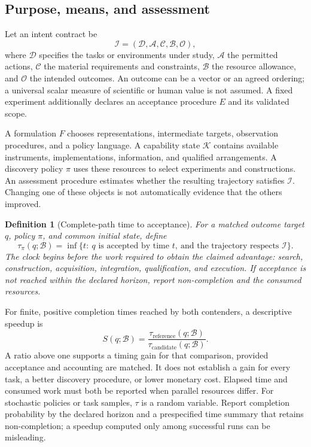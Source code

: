 \documentclass[11pt,letterpaper]{article}
\newtheorem{definition}{Definition}[section]
\theoremstyle{remark}\newtheorem{remark}{Remark}[section]
\newcommand{\I}{\mathcal I}
\newcommand{\K}{\mathcal K}
\newcommand{\D}{\mathcal D}
\newcommand{\A}{\mathcal A}
\begin{document}
\subsection{Purpose, means, and assessment}
Let an intent contract be
\begin{equation}
 \I=(\D,\A,\mathcal C,\mathcal B,\mathcal O),
\end{equation}
where $\D$ specifies the tasks or environments under study, $\A$ the permitted actions,
$\mathcal C$ the material requirements and constraints, $\mathcal B$ the resource allowance,
and $\mathcal O$ the intended outcomes.
An outcome can be a vector or an agreed ordering; a universal scalar measure of scientific or human value is not assumed.
A fixed experiment additionally declares an acceptance procedure $E$ and its validated scope.

A formulation $F$ chooses representations, intermediate targets, observation procedures, and a policy language.
A capability state $\K$ contains available instruments, implementations, information, and qualified arrangements.
A discovery policy $\pi$ uses these resources to select experiments and constructions.
An assessment procedure estimates whether the resulting trajectory satisfies $\I$.
Changing one of these objects is not automatically evidence that the others improved.

\begin{definition}[Complete-path time to acceptance]
For a matched outcome target $q$, policy $\pi$, and common initial state, define
\begin{equation}\label{eq:arrival}
 \tau_\pi(q;\mathcal B)=
 \inf\{t:\ q\text{ is accepted by time }t,\ \text{and the trajectory respects }\I\}.
\end{equation}
The clock begins before the work required to obtain the claimed advantage:
search, construction, acquisition, integration, qualification, and execution.
If acceptance is not reached within the declared horizon, report non-completion and the consumed resources.
\end{definition}

For finite, positive completion times reached by both contenders, a descriptive speedup is
\begin{equation}\label{eq:speed}
 S(q;\mathcal B)=\frac{\tau_{\mathrm{reference}}(q;\mathcal B)}
                      {\tau_{\mathrm{candidate}}(q;\mathcal B)}.
\end{equation}
A ratio above one supports a timing gain for that comparison, provided acceptance and accounting are matched.
It does not establish a gain for every task, a better discovery procedure, or lower monetary cost.
Elapsed time and consumed work must both be reported when parallel resources differ.
For stochastic policies or task samples, $\tau$ is a random variable.
Report completion probability by the declared horizon and a prespecified time summary that retains non-completion; a speedup computed only among successful runs can be misleading.
\end{document}
